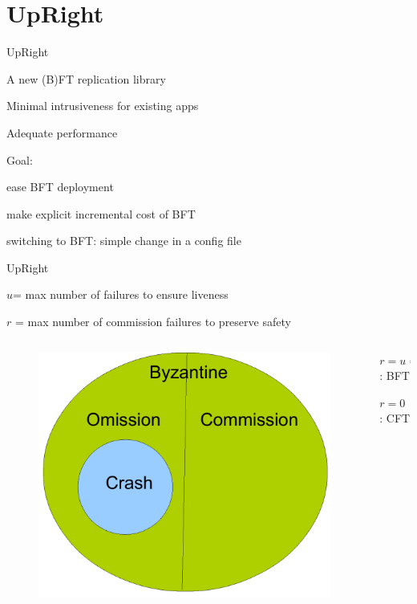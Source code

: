 \section{UpRight}

\begin{frame}{UpRight}

\begin{Bib}
\end{Bib}

\BIL
\item A new (B)FT replication library
\item Minimal intrusiveness for existing apps 
\item Adequate performance 
\item Goal: 
	\BI
	\item ease BFT deployment 
	\item make explicit incremental cost of BFT 
	\item switching to BFT: simple change in a config file
	\EI
\EIL

\end{frame}

\begin{frame}{UpRight}
\BIL
\item $u$= max number of failures to ensure liveness
\item $r$ = max number of \alert{commission} failures to preserve safety
\EIL

\begin{columns}
\begin{column}{0.5\textwidth}
\begin{figure}
	\includegraphics[width=\textwidth]{commission}
\end{figure}
\end{column}
\begin{column}{0.5\textwidth}
\BIL
\item $r=u=f$: BFT 
\item $r=0$ : CFT	
\EIL 
	
\end{column}
\end{columns}
	
\end{frame}

